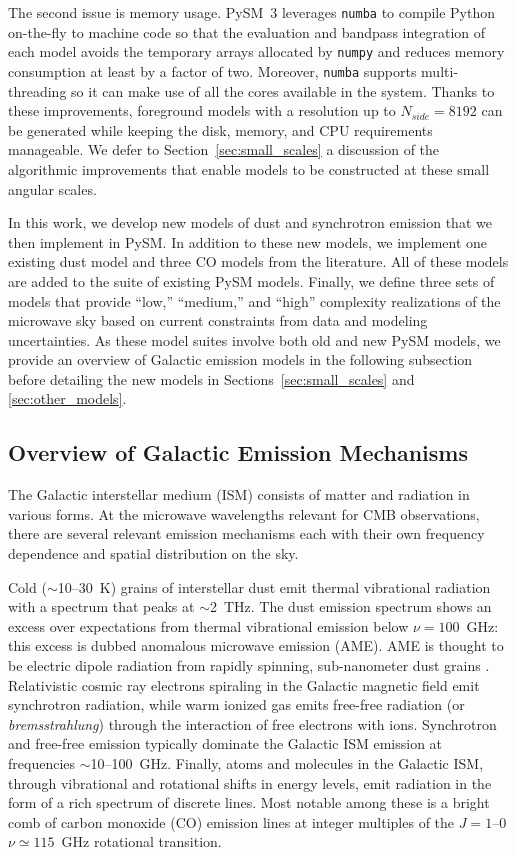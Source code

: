 \documentclass[twocolumn]{aastex631}
\begin{document}
The second issue is memory usage. PySM~3 leverages \texttt{numba} \citep{Lam:2015} to compile Python on-the-fly to machine code so that the evaluation and bandpass integration of each model avoids the temporary arrays allocated by \texttt{numpy} and reduces memory consumption at least by a factor of two. Moreover, \texttt{numba} supports multi-threading so it can make use of all the cores available in the system. Thanks to these improvements, foreground models with a resolution up to $N_{side}=8192$ can be generated while keeping the disk, memory, and CPU requirements manageable. We defer to Section~\ref{sec:small_scales} a discussion of the algorithmic improvements that enable models to be constructed at these small angular scales.

In this work, we develop new models of dust and synchrotron emission that we then implement in PySM. In addition to these new models, we implement one existing dust model and three CO models from the literature. All of these models are added to the suite of existing PySM models. Finally, we define three sets of models that provide ``low,'' ``medium,'' and ``high'' complexity realizations of the microwave sky based on current constraints from data and modeling uncertainties. As these model suites involve both old and new PySM models, we provide an overview of Galactic emission models in the following subsection before detailing the new models in Sections~\ref{sec:small_scales} and \ref{sec:other_models}.

\subsection{Overview of Galactic Emission Mechanisms}
The Galactic interstellar medium (ISM) consists of matter and radiation in various forms. At the microwave wavelengths relevant for CMB observations, there are several relevant emission mechanisms each with their own frequency dependence and spatial distribution on the sky.

Cold ($\sim$10--30~K) grains of interstellar dust emit thermal vibrational radiation with a spectrum that peaks at $\sim$2~THz. The dust emission spectrum shows an excess over expectations from thermal vibrational emission below $\nu=100$~GHz: this excess is dubbed anomalous microwave emission (AME). AME is thought to be electric dipole radiation from rapidly spinning, sub-nanometer dust grains \citep{Draine:1998}. Relativistic cosmic ray electrons spiraling in the Galactic magnetic field emit synchrotron radiation, while warm ionized gas emits free-free radiation (or \emph{bremsstrahlung}) through the interaction of free electrons with ions. Synchrotron and free-free emission typically dominate the Galactic ISM emission at frequencies $\sim$10--100~GHz. Finally, atoms and molecules in the Galactic ISM, through vibrational and rotational shifts in energy levels, emit radiation in the form of a rich spectrum of discrete lines. Most notable among these is a bright comb of carbon monoxide (CO) emission lines at integer multiples of the $J=1$--$0$ $\nu \simeq 115$~GHz rotational transition.
\end{document}

